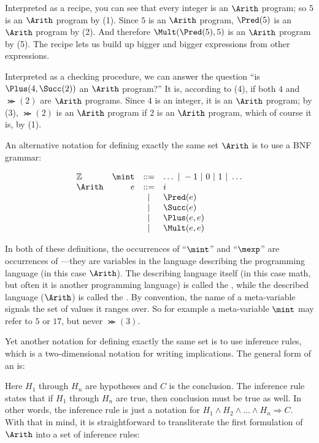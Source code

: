 Interpreted as a recipe, you can see that every integer is an
$\Arith$ program; so $5$ is an $\Arith$ program by
(1).  Since $5$ is an $\Arith$ program, $\Pred(5)$ is
an $\Arith$ program by (2).  And therefore
$\Mult(\Pred(5),5)$ is an $\Arith$ program by
(5).  The recipe lets us build up bigger and bigger expressions from
other expressions.

Interpreted as a checking procedure, we can answer the question ``is
$\Plus(4,\Succ(2))$ an $\Arith$ program?''  It
is, according to (4), if both $4$ and $\Succ(2)$ are
$\Arith$ programs.  Since $4$ is an integer, it is an
$\Arith$ program; by (3), $\Succ(2)$ is an
$\Arith$ program if $2$ is an $\Arith$ program, which
of course it is, by (1).

An alternative notation for defining exactly the same set
$\Arith$ is to use a BNF grammar:

\[
\begin{array}{lrcll}
\mathbb{Z}
               & \mint & ::= & \dots\ |\ -1\ |\ 0\ |\ 1\ |\ \dots\\
 \Arith
               & e & ::= & i \\ %
               &   & |   & \Pred(e)\\
               &   & |   & \Succ(e)\\
               &   & |   & \Plus(e,e)\\
               &   & |   & \Mult(e,e)
\end{array}
\]

In both of these definitions, the occurrences of ``$\mint$'' and
``$\mexp$'' are occurrences of ---they are
variables in the language describing the programming language (in this
case $\Arith$).  The describing language itself (in this case math,
but often it is another programming language) is called the
, while the described language ($\Arith$) is
called the .  By convention, the name of a
meta-variable signals the set of values it ranges over.  So for
example a meta-variable $\mint$ may refer to $5$ or $17$, but never
$\Succ(3)$.

Yet another notation for defining exactly the same set is to use
inference rules, which is a two-dimensional notation for writing
implications.  The general form of an  is:
\begin{mathpar}
\end{mathpar}
Here $H_1$ through $H_n$ are hypotheses and $C$ is the conclusion.
The inference rule states that if $H_1$ through $H_n$ are true, then
conclusion must be true as well.  In other words, the inference rule
is just a notation for $H_1 \wedge H_2 \wedge \dots \wedge H_n
\Rightarrow C$.  With that in mind, it is straightforward to
transliterate the first formulation of $\Arith$ into a set of
inference rules:

